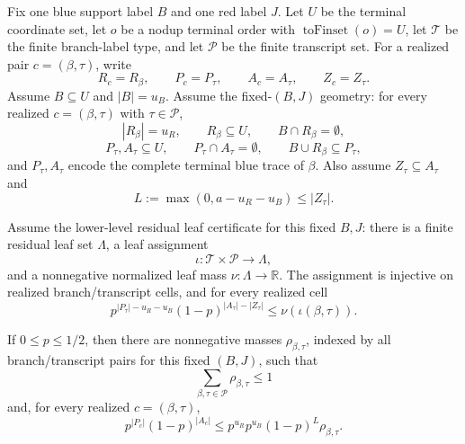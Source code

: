 \begin{helper}
Fix one blue support label \(B\) and one red label \(J\).  Let \(U\) be the
terminal coordinate set, let \(o\) be a nodup terminal order with
\(\operatorname{toFinset}(o)=U\), let \(\mathcal T\) be the finite
branch-label type, and let \(\mathcal P\) be the finite transcript set.  For
a realized pair \(c=(\beta,\tau)\), write
\[
R_c=R_\beta,\qquad P_c=P_\tau,\qquad A_c=A_\tau,\qquad Z_c=Z_\tau .
\]
Assume \(B\subseteq U\) and \(|B|=u_B\).  Assume the fixed-\((B,J)\)
geometry: for every realized \(c=(\beta,\tau)\) with
\(\tau\in\mathcal P\),
\[
|R_\beta|=u_R,\qquad R_\beta\subseteq U,\qquad B\cap R_\beta=\emptyset,
\]
\[
P_\tau,A_\tau\subseteq U,\qquad P_\tau\cap A_\tau=\emptyset,\qquad
B\cup R_\beta\subseteq P_\tau,
\]
and \(P_\tau,A_\tau\) encode the complete terminal blue trace of \(\beta\).
Also assume \(Z_\tau\subseteq A_\tau\) and
\[
L:=\max(0,a-u_R-u_B)\le |Z_\tau|.
\]

Assume the lower-level residual leaf certificate for this fixed \(B,J\):
there is a finite residual leaf set \(\Lambda\), a leaf assignment
\[
\iota:\mathcal T\times\mathcal P\to\Lambda,
\]
and a nonnegative normalized leaf mass
\(\nu:\Lambda\to\mathbb R\).  The assignment is injective on realized
branch/transcript cells, and for every realized cell
\[
p^{|P_\tau|-u_R-u_B}(1-p)^{|A_\tau|-|Z_\tau|}
  \le \nu(\iota(\beta,\tau)).
\]

If \(0\le p\le1/2\), then there are nonnegative masses
\(\rho_{\beta,\tau}\), indexed by all branch/transcript pairs for this fixed
\((B,J)\), such that
\[
\sum_{\beta,\tau\in\mathcal P}\rho_{\beta,\tau}\le1
\]
and, for every realized \(c=(\beta,\tau)\),
\[
p^{|P_c|}(1-p)^{|A_c|}
\le
p^{u_R}p^{u_B}(1-p)^L\rho_{\beta,\tau}.
\]
\end{helper}
